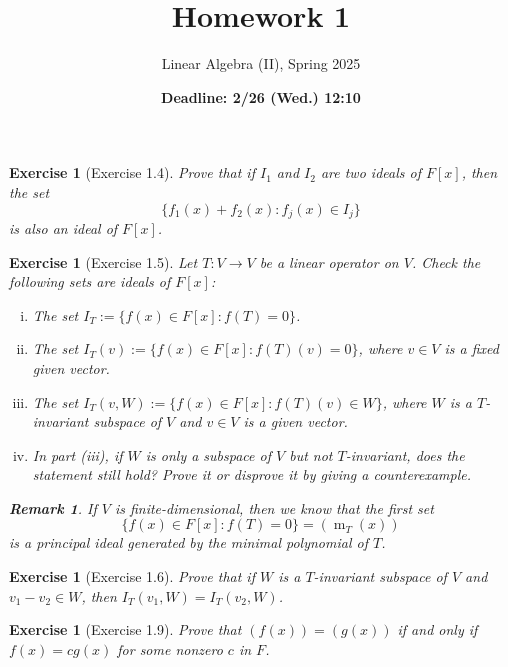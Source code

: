 \documentclass[a4paper]{article}
\theoremstyle{mystyle}
\newtheorem{exercise}[theorem]{Exercise}
\newtheorem*{remark}{Remark}
\newcommand{\6}{\partial}
\DeclareMathOperator{\m}{m}
\begin{document}
\title{\textbf{Homework 1}}
\author{Linear Algebra (II), Spring 2025}
\date{\textbf{Deadline: 2/26 (Wed.) 12:10}}
\maketitle

\begin{exercise}[Exercise 1.4] 
    Prove that if $I_1$ and $I_2$ are two ideals of $F[x]$, then the set 
    \[
    \{f_1(x)+f_2(x): f_j(x)\in I_j\}
    \]
    is also an ideal of $F[x]$.
\end{exercise}

\begin{exercise}[Exercise 1.5] 
    Let \( T: V \to V \) be a linear operator on \( V \). Check the following sets are ideals of \( F[x] \): 
    \begin{enumerate}[(i)]
        \item The set \( I_T:=\{ f(x) \in F[x] : f(T) = 0 \} \).
        \item The set \( I_T(v):=\{ f(x) \in F[x] : f(T)(v) = 0 \} \),
        where \( v \in V \) is a fixed given vector.
        \item The set \( I_T(v,W) := \{ f(x) \in F[x] : f(T)(v) \in W \} \), where \( W \) is a \( T \)-invariant subspace of \( V \) and \( v \in V \) is a given vector.
        \item In part (iii), if \( W \) is only a subspace of \( V \) but not \( T \)-invariant, does the statement still hold? Prove it or disprove it by giving a counterexample.
    \end{enumerate}
    \begin{remark}
        If \( V \) is finite-dimensional, then we know that the first set
        \[
        \{ f(x) \in F[x] : f(T) = 0 \} = (\m_T(x))
        \]
        is a principal ideal generated by the minimal polynomial of \( T \).
    \end{remark}
\end{exercise}

\begin{exercise}[Exercise 1.6] 
    Prove that if \( W \) is a \( T \)-invariant subspace of \( V \) and \( v_1 - v_2 \in W \), then \( I_T(v_1,W)=I_T(v_2,W) \).
\end{exercise}

\begin{exercise}[Exercise 1.9]
    Prove that $(f(x)) = (g(x))$ if and only if $f(x) = cg(x)$ for some nonzero $c$ in $F$.
\end{exercise}
\end{document}

